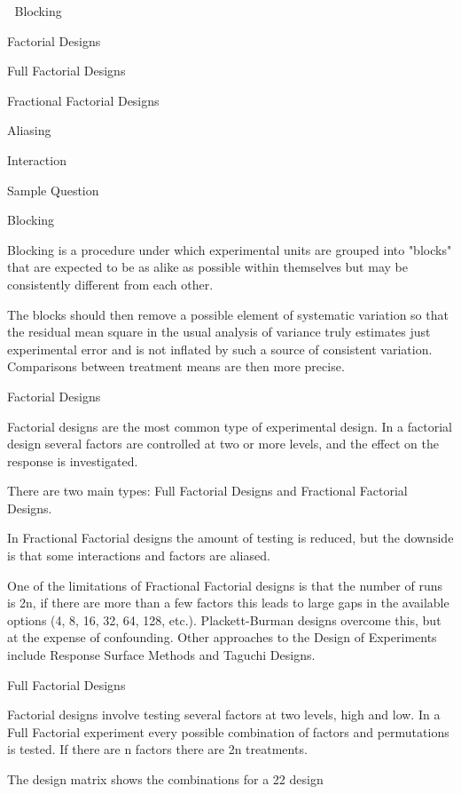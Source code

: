 

Blocking

Factorial Designs

Full Factorial Designs

Fractional Factorial Designs

Aliasing

Interaction

Sample Question


Blocking


Blocking is a procedure under which experimental units are grouped into "blocks" that are expected to be as alike as possible within themselves but may be consistently different from each other. 


The blocks should then remove a possible element of systematic variation so that the residual mean square in the usual analysis of variance truly estimates just experimental error and is not inflated by such a source of consistent variation. Comparisons between treatment means are then more precise.


Factorial Designs


Factorial designs are the most common type of experimental design. In a factorial design several factors are controlled at two or more levels, and the effect on the response is investigated.

There are two main types: Full Factorial Designs and Fractional Factorial Designs. 


In Fractional Factorial designs the amount of testing is reduced, but the downside is that some interactions and factors are aliased. 


One of the limitations of Fractional Factorial designs is that the number of runs is 2n, if there are more than a few factors this leads to large gaps in the available options (4, 8, 16, 32, 64, 128, etc.). Plackett-Burman designs overcome this, but at the expense of confounding. Other approaches to the Design of Experiments include Response Surface Methods and Taguchi Designs.



Full Factorial Designs


Factorial designs involve testing several factors at two levels, high and low. In a Full Factorial experiment every possible combination of factors and permutations is tested. If there are n factors there are 2n treatments.



The design matrix shows the combinations for a 22 design











